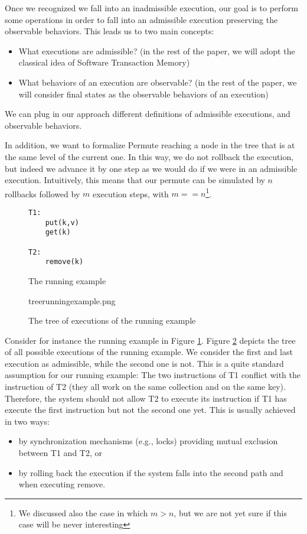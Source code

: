 Once we recognized we fall into an inadmissible execution, our goal is to perform some operations in order to fall into an admissible execution preserving the observable behaviors.
This leads us to two main concepts:
\begin{itemize}
\item What executions are admissible? (in the rest of the paper, we will adopt the classical idea of Software Transaction Memory)
\item What behaviors of an execution are observable? (in the rest of the paper, we will consider final states as the observable behaviors of an execution)
\end{itemize}

We can plug in our approach different definitions of admissible executions, and observable behaviors.

In addition, we want to formalize Permute reaching a node in the tree that is at the same level of the current one. In this way, we do not rollback the execution, but indeed we advance it by one step as we would do if we were in an admissible execution. Intuitively, this means that our permute can be simulated by $n$ rollbacks followed by $m$ execution steps, with $m==n$\footnote{We discussed also the case in which $m>n$, but we are not yet sure if this case will be never interesting}.

\begin{figure}
\begin{lstlisting}
T1:
	put(k,v)
	get(k)

T2:
	remove(k)
\end{lstlisting}
\caption{The running example}
\label{lst:runningexample}
\end{figure}

\begin{figure}[ht]
treerunningexample.png
\caption{The tree of executions of the running example}
\label{fig:treerunningexample}
\end{figure}

Consider for instance the running example in Figure \ref{lst:runningexample}.
Figure \ref{fig:treerunningexample} depicts the tree of all possible executions of the running example. We consider the first and last execution as admissible, while the second one is not. This is a quite standard assumption for our running example: The two instructions of T1 conflict with the instruction of T2 (they all work on the same collection and on the same key). Therefore, the system should not allow T2 to execute its instruction if T1 has execute the first instruction but not the second one yet. This is usually achieved in two ways:
\begin{itemize}
\item by synchronization mechanisms (e.g., locks) providing mutual exclusion between T1 and T2, or
\item by rolling back the execution if the system falls into the second path and when executing remove.
\end{itemize}

